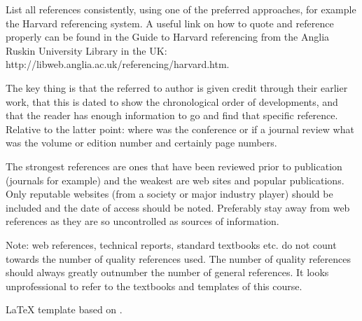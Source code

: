 \documentclass{article}
\begin{document}



List all references consistently, using one of the preferred approaches, for example the Harvard referencing system. A useful link on how to quote and reference properly can be found in the Guide to Harvard referencing from the Anglia Ruskin University Library in the UK:
http://libweb.anglia.ac.uk/referencing/harvard.htm.

The key thing is that the referred to author is given credit through their earlier work, that this is dated to show the chronological order of developments, and that the reader has enough information to go and find that specific reference. Relative to the latter point: where was the conference or if a journal review what was the volume or edition number and certainly page numbers.

The strongest references are ones that have been reviewed prior to publication (journals for example) and the weakest are web sites and popular publications. Only reputable websites (from a society or major industry player) should be included and the date of access should be noted. Preferably stay away from web references as they are so uncontrolled as sources of information.

Note: web references, technical reports, standard textbooks etc. do not count towards the number of quality references used. The number of quality references should always greatly outnumber the number of general references. It looks unprofessional to refer to the textbooks and templates of this course.


\LaTeX {} template based on \cite{template}.
\end{document}
